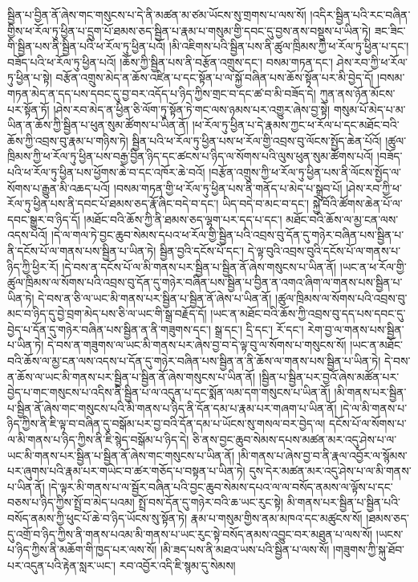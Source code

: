 སྦྱིན་པ་བྱིན་ནོ་ཞེས་གང་གསུངས་པ་དེ་ནི་མཚན་མ་ཙམ་ཡོངས་སུ་གྲགས་པ་ལས་སོ། །འདིར་སྦྱིན་པའི་རང་བཞིན་གྱིས་ཕ་རོལ་ཏུ་ཕྱིན་པ་དྲུག་པོ་ཐམས་ཅད་སྦྱིན་པ་རྣམ་པ་གསུམ་གྱི་དབང་དུ་བྱས་ནས་བསྡུས་པ་ཡིན་ཏེ། ཟང་ཟིང་གི་སྦྱིན་པས་ནི་སྦྱིན་པའི་ཕ་རོལ་ཏུ་ཕྱིན་པའོ། །མི་འཇིགས་པའི་སྦྱིན་པས་ནི་ཚུལ་ཁྲིམས་ཀྱི་ཕ་རོལ་ཏུ་ཕྱིན་པ་དང་། བཟོད་པའི་ཕ་རོལ་ཏུ་ཕྱིན་པའོ། །ཆོས་ཀྱི་སྦྱིན་པས་ནི་བརྩོན་འགྲུས་དང་། བསམ་གཏན་དང་། ཤེས་རབ་ཀྱི་ཕ་རོལ་ཏུ་ཕྱིན་པ་སྟེ། བརྩོན་འགྲུས་མེད་ན་ཆོས་འཛིན་པ་དང་སྟོན་པ་ལ་སྐྱོ་བཞིན་པས་ཆོས་སྟོན་པར་མི་བྱེད་དོ། །བསམ་གཏན་མེད་ན་དད་པས་དབང་དུ་བྱ་བར་འདོད་པ་ཉིད་ཀྱིས་གྲང་བ་དང་ཚ་བ་མི་བཟོད་དེ། ཀུན་ནས་ཉོན་མོངས་པར་སྟོན་ཏོ། །ཤེས་རབ་མེད་ན་ཕྱིན་ཅི་ལོག་ཏུ་སྟོན་ཏེ་གང་ལས་ཉམས་པར་འགྱུར་ཞེས་བྱ་སྟེ། གསུམ་པོ་མེད་པ་མ་ཡིན་ན་ཆོས་ཀྱི་སྦྱིན་པ་ཕུན་སུམ་ཚོགས་པ་ཡིན་ནོ། །ཕ་རོལ་ཏུ་ཕྱིན་པ་དེ་རྣམས་ཀྱང་ཕ་རོལ་པ་དང་མཐོང་བའི་ཆོས་ཀྱི་འབྲས་བུ་རྣམ་པ་གཉིས་ཏེ། སྦྱིན་པའི་ཕ་རོལ་ཏུ་ཕྱིན་པས་ཕ་རོལ་གྱི་འབྲས་བུ་ལོངས་སྤྱོད་ཆེན་པོའོ། །ཚུལ་ཁྲིམས་ཀྱི་ཕ་རོལ་ཏུ་ཕྱིན་པས་བརྒྱ་བྱིན་ཉིད་དང་ཚངས་པ་ཉིད་ལ་སོགས་པའི་ལུས་ཕུན་སུམ་ཚོགས་པའོ། །བཟོད་པའི་ཕ་རོལ་ཏུ་ཕྱིན་པས་ཕྱོགས་ཆེ་བ་དང་འཁོར་ཆེ་བའོ། །བརྩོན་འགྲུས་ཀྱི་ཕ་རོལ་ཏུ་ཕྱིན་པས་ནི་ལོངས་སྤྱོད་ལ་སོགས་པ་རྒྱུན་མི་འཆད་པའོ། །བསམ་གཏན་གྱི་ཕ་རོལ་ཏུ་ཕྱིན་པས་ནི་གནོད་པ་མེད་པ་སྒྲུབ་པོ། །ཤེས་རབ་ཀྱི་ཕ་རོལ་ཏུ་ཕྱིན་པས་ནི་དབང་པོ་ཐམས་ཅད་རྣོ་ཞིང་བདེ་བ་དང་། ཡིད་བདེ་བ་མང་བ་དང་། སྐྱེ་བོའི་ཚོགས་ཆེན་པོ་ལ་དབང་སྒྱུར་བ་ཉིད་དོ། །མཐོང་བའི་ཆོས་ཀྱི་ནི་ཐམས་ཅད་ལྷག་པར་དད་པ་དང་། མཐོང་བའི་ཆོས་ལ་མྱ་ངན་ལས་འདས་པའོ། །དེ་ལ་གལ་ཏེ་བྱང་ཆུབ་སེམས་དཔའ་ཕ་རོལ་གྱི་སྦྱིན་པའི་འབྲས་བུ་དོན་དུ་གཉེར་བཞིན་པས་སྦྱིན་པ་ནི་དངོས་པོ་ལ་གནས་པས་སྦྱིན་པ་ཡིན་ཏེ། སྦྱིན་བྱའི་དངོས་པོ་དང་། དེ་ལྟ་བུའི་འབྲས་བུའི་དངོས་པོ་ལ་གནས་པ་ཉིད་ཀྱི་ཕྱིར་རོ། །དེ་བས་ན་དངོས་པོ་ལ་མི་གནས་པར་སྦྱིན་པ་སྦྱིན་ནོ་ཞེས་གསུངས་པ་ཡིན་ནོ། །ཡང་ན་ཕ་རོལ་གྱི་ཚུལ་ཁྲིམས་ལ་སོགས་པའི་འབྲས་བུ་དོན་དུ་གཉེར་བཞིན་པས་སྦྱིན་པ་བྱིན་ན་འགའ་ཞིག་ལ་གནས་པས་སྦྱིན་པ་ཡིན་ཏེ། དེ་བས་ན་ཅི་ལ་ཡང་མི་གནས་པར་སྦྱིན་པ་སྦྱིན་ནོ་ཞེས་པ་ཡིན་ནོ། །ཚུལ་ཁྲིམས་ལ་སོགས་པའི་འབྲས་བུ་མང་བ་ཉིད་དུ་བྱེ་བྲག་མེད་པས་ཅི་ལ་ཡང་གི་སྒྲ་བརྗོད་དོ། །ཡང་ན་མཐོང་བའི་ཆོས་ཀྱི་འབྲས་བུ་དད་པས་དབང་དུ་བྱེད་པ་དོན་དུ་གཉེར་བཞིན་པས་སྦྱིན་ན་ནི་གཟུགས་དང་། སྒྲ་དང་། དྲི་དང་། རོ་དང་། རེག་བྱ་ལ་གནས་པས་སྦྱིན་པ་ཡིན་ཏེ། དེ་བས་ན་གཟུགས་ལ་ཡང་མི་གནས་པར་ཞེས་བྱ་བ་དེ་ལྟ་བུ་ལ་སོགས་པ་གསུངས་སོ། །ཡང་ན་མཐོང་བའི་ཆོས་ལ་མྱ་ངན་ལས་འདས་པ་དོན་དུ་གཉེར་བཞིན་པས་སྦྱིན་ན་ནི་ཆོས་ལ་གནས་པས་སྦྱིན་པ་ཡིན་ཏེ། དེ་བས་ན་ཆོས་ལ་ཡང་མི་གནས་པར་སྦྱིན་པ་སྦྱིན་ནོ་ཞེས་གསུངས་པ་ཡིན་ནོ། །སྦྱིན་པ་སྦྱིན་པར་བྱའོ་ཞེས་མཚོན་པར་བྱེད་པ་གང་གསུངས་པ་འདིས་ནི་སྦྱིན་པ་ལ་འདུན་པ་དང་སྨོན་ལམ་དག་གསུངས་པ་ཡིན་ནོ། །མི་གནས་པར་སྦྱིན་པ་སྦྱིན་ནོ་ཞེས་གང་གསུངས་པའི་མི་གནས་པ་ཉིད་ནི་དོན་དམ་པ་རྣམ་པར་གཞག་པ་ཡིན་ནོ། །དེ་ལ་མི་གནས་པ་ཉིད་ཀྱིས་ནི་ཇི་ལྟ་བ་བཞིན་དུ་བསྒོམ་པར་བྱ་བའི་དོན་དམ་པ་ཡོངས་སུ་གསལ་བར་བྱེད་ལ། དངོས་པོ་ལ་སོགས་པ་ལ་མི་གནས་པ་ཉིད་ཀྱིས་ནི་ཇི་སྙེད་བསྒོམ་པ་ཉིད་དེ། ཅི་ནས་བྱང་ཆུབ་སེམས་དཔས་མཚན་མར་འདུ་ཤེས་པ་ལ་ཡང་མི་གནས་པར་སྦྱིན་པ་སྦྱིན་ནོ་ཞེས་གང་གསུངས་པ་ཡིན་ནོ། །མི་གནས་པ་ཞེས་བྱ་བ་ནི་རྣལ་འབྱོར་ལ་སྙོམས་པར་ཞུགས་པའི་རྣམ་པར་གཡེང་བ་ཚར་གཅོད་པ་བསྟན་པ་ཡིན་ཏེ། དུས་དེར་མཚན་མར་འདུ་ཤེས་པ་ལ་མི་གནས་པ་ཡིན་ནོ། །དེ་ལྟར་མི་གནས་པ་ལ་སྦྱོར་བཞིན་པའི་བྱང་ཆུབ་སེམས་དཔའ་ལ་ལ་བསོད་ནམས་ལ་ལྟོས་པ་དང་བཅས་པ་ཉིད་ཀྱིས་སྤྲོ་བ་མེད་པའམ། སྤྲོ་བས་དོན་དུ་གཉེར་བའི་ཆ་ཡང་རུང་སྟེ། མི་གནས་པར་སྦྱིན་པ་སྦྱིན་པའི་བསོད་ནམས་ཀྱི་ཕུང་པོ་ཆེ་བ་ཉིད་ཡོངས་སུ་སྟོན་ཏེ། རྣམ་པ་གསུམ་གྱིས་ནམ་མཁའ་དང་མཚུངས་སོ། །ཐམས་ཅད་དུ་འགྲོ་བ་ཉིད་ཀྱིས་ནི་གནས་པའམ་མི་གནས་པ་ཡང་རུང་སྟེ་བསོད་ནམས་འབྱུང་བར་མཐུན་པ་ལས་སོ། །ཡངས་པ་ཉིད་ཀྱིས་ནི་མཆོག་གི་ཁྱད་པར་ལས་སོ། །མི་ཟད་པས་ནི་མཐའ་ཡས་པའི་སྦྱིན་པ་ལས་སོ། །གཟུགས་ཀྱི་སྐུ་ཐོབ་པར་འདུན་པའི་རྟེན་སླར་ཡང་། རབ་འབྱོར་འདི་ཇི་སྙམ་དུ་སེམས། 